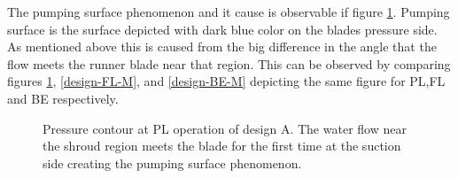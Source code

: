 The pumping surface phenomenon and it cause is observable if figure \ref{design-PL-M}. Pumping surface is the surface depicted with dark blue color on the blades pressure side. As mentioned above this is caused from the big difference in the angle that the flow meets the runner blade near that region. This can be observed by comparing figures \ref{design-PL-M}, \ref{design-FL-M}, and \ref{design-BE-M} depicting the same figure for PL,FL and BE respectively.   

\begin{figure}[h!]
\begin{minipage}[b]{1\linewidth}
 \centering
\end{minipage}
\caption{Pressure contour at PL operation of design A. The water flow near the shroud region meets the blade for the first time at the suction side creating the pumping surface phenomenon. }
\label{design-PL-M}
\end{figure}


